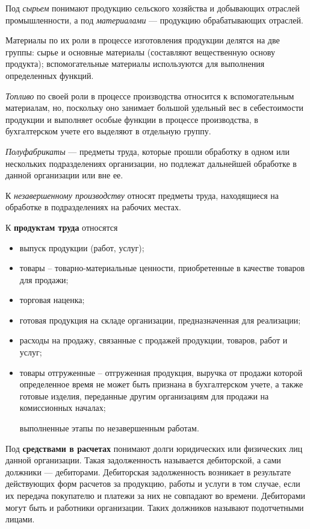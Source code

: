 \documentclass[a4paper,14pt]{extarticle}
\begin{document}
Под \textit{сырьем} понимают продукцию сельского хозяйства и добывающих отраслей промышленности, а под \textit{материалами} — продукцию обрабатывающих отраслей.

Материалы по их роли в процессе изготовления продукции делятся на две группы: сырье и основные материалы (составляют вещественную основу продукта); вспомогательные материалы используются для выполнения определенных функций.

\textit{Топливо} по своей роли в процессе производства относится к вспомогательным материалам, но, поскольку оно занимает большой удельный вес в себестоимости продукции и выполняет особые функции в процессе производства, в бухгалтерском учете его выделяют в отдельную группу.

\textit{Полуфабрикаты} — предметы труда, которые прошли обработку в одном или нескольких подразделениях организации, но подлежат дальнейшей обработке в данной организации или вне ее.

К \textit{незавершенному производству} относят предметы труда, находящиеся на обработке в подразделениях на рабочих местах.

К {\bf продуктам труда} относятся 
\begin{itemize}
	\item выпуск продукции (работ, услуг);
	
	\item товары – товарно-материальные ценности, приоб­ретенные в качестве товаров для продажи;
	
	\item торговая наценка;
	
	\item готовая продукция на складе организации, предназначенная для реализации;
	
	\item расходы на продажу, связанные с продажей про­дукции, товаров, работ и услуг;
	
	\item товары отгруженные – отгруженная продукция, выручка от продажи которой определенное время не может быть признана в бухгалтерском учете, а также готовые изделия, переданные другим организациям для продажи на комиссионных началах;
	
	выполненные этапы по незавершенным работам.
\end{itemize}

Под {\bf средствами в расчетах} понимают долги юридических или физических лиц данной организации. Такая задолженность называется дебиторской, а сами должники — дебиторами. Дебиторская задолженность возникает в результате действующих форм расчетов за продукцию, работы и услуги в том случае, если их передача покупателю и платежи за них не совпадают во времени. Дебиторами могут быть и работники организации. Таких должников называют подотчетными лицами.
\end{document}
